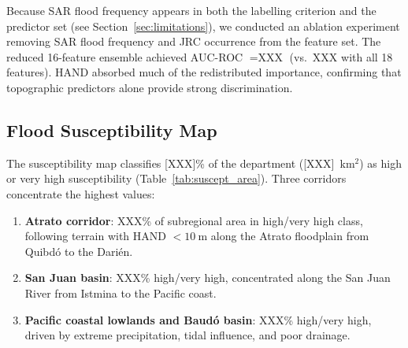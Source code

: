 \documentclass{article}
\begin{document}
Because SAR flood frequency appears in both the labelling criterion and the predictor set (see Section~\ref{sec:limitations}), we conducted an ablation experiment removing SAR flood frequency and JRC occurrence from the feature set. The reduced 16-feature ensemble achieved AUC-ROC $= \text{XXX}$ (vs.\ XXX with all 18 features). HAND absorbed much of the redistributed importance, confirming that topographic predictors alone provide strong discrimination.

\subsection{Flood Susceptibility Map}


The susceptibility map classifies [XXX]\% of the department ([XXX]~km$^2$) as high or very high susceptibility (Table~\ref{tab:suscept_area}). Three corridors concentrate the highest values:

\begin{enumerate}
    \item \textbf{Atrato corridor}: XXX\% of subregional area in high/very high class, following terrain with HAND $< \SI{10}{\metre}$ along the Atrato floodplain from Quibd\'o to the Dari\'en.
    \item \textbf{San Juan basin}: XXX\% high/very high, concentrated along the San Juan River from Istmina to the Pacific coast.
    \item \textbf{Pacific coastal lowlands and Baud\'o basin}: XXX\% high/very high, driven by extreme precipitation, tidal influence, and poor drainage.
\end{enumerate}
\end{document}
